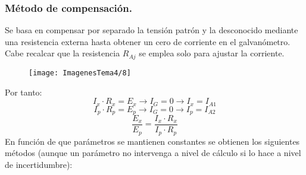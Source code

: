 \subsubsection{Método de compensación.}
Se basa en compensar por separado la tensión patrón y la desconocido mediante una resistencia externa hasta obtener un cero de corriente en el galvanómetro. Cabe recalcar que la resistencia $R_{Aj}$ se emplea solo para ajustar la corriente.
\begin{figure}[H]
	\centering
	\texttt{[image: ImagenesTema4/8]}
	\label{fig:8}
\end{figure}
Por tanto:
\[I_x\cdot R_x=E_x\rightarrow I_G=0\rightarrow I_x=I_{A1}\]
\[I_p\cdot R_p=E_p\rightarrow I_G=0\rightarrow I_p=I_{A2}\]
\[\frac{E_x}{E_p}=\frac{I_x\cdot R_x}{I_p \cdot R_p}\]
En función de que parámetros se mantienen constantes se obtienen los siguientes métodos (aunque un parámetro no intervenga a nivel de cálculo si lo hace a nivel de incertidumbre):
